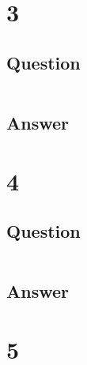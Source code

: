 \documentclass[letterpaper,11pt]{article}
\newcommand*{\srcPath}{../src}%
\begin{document}
\clearpage


\section*{3}

\subsection*{Question}

\begin{verbatim}

\end{verbatim}

\subsection*{Answer}

% 

\clearpage


\section*{4}

\subsection*{Question}

\begin{verbatim}

\end{verbatim}

\subsection*{Answer}




\clearpage


\section*{5}
\end{document}
